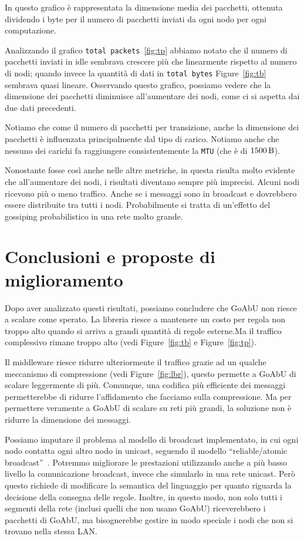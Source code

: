 \documentclass[target=bach]{thud}
\begin{document}
In questo grafico è rappresentata la dimensione media dei pacchetti, ottenuta dividendo i byte per il numero di pacchetti inviati da ogni nodo per ogni computazione.

Analizzando il grafico \lstinline{total packets}~\ref{fig:tp} abbiamo notato che il numero di pacchetti inviati in idle sembrava crescere più che linearmente rispetto al numero di nodi; quando invece la quantità di dati in \lstinline{total bytes} Figure~\ref{fig:tb} sembrava quasi lineare.
Osservando questo grafico, possiamo vedere che la dimensione dei pacchetti diminuisce all'aumentare dei nodi, come ci si aspetta dai due dati precedenti.

Notiamo che come il numero di pacchetti per transizione, anche la dimensione dei pacchetti è influenzata principalmente dal tipo di carico.
Notiamo anche che nessuno dei carichi fa raggiungere consistentemente la \lstinline{MTU} (che è di $\qty{1500}{\byte}$).

Nonostante fosse così anche nelle altre metriche, in questa risulta molto evidente che all'aumentare dei nodi, i risultati diventano sempre più imprecisi.
Alcuni nodi ricevono più o meno traffico. Anche se i messaggi sono in broadcast e dovrebbero essere distribuite tra tutti i nodi.
Probabilmente si tratta di un'effetto del gossiping probabilistico in una rete molto grande.

\section{Conclusioni e proposte di miglioramento}

Dopo aver analizzato questi risultati, possiamo concludere che GoAbU non riesce a scalare come sperato. La libreria riesce a mantenere un costo per regola non troppo alto quando si arriva a grandi quantità di regole esterne.Ma il traffico complessivo rimane troppo alto (vedi Figure~\ref{fig:tb} e Figure~\ref{fig:tp}).

Il middleware riesce ridurre ulteriormente il traffico grazie ad un qualche meccanismo di compressione (vedi Figure~\ref{fig:lbr}), questo permette a GoAbU di scalare leggermente di più. Comunque, una codifica più efficiente dei messaggi permetterebbe di ridurre l'affidamento che facciamo sulla compressione. Ma per permettere veramente a GoAbU di scalare su reti più grandi, la soluzione non è ridurre la dimensione dei messaggi.

Possiamo imputare il problema al modello di broadcast implementato, in cui ogni nodo contatta ogni altro nodo in unicast, seguendo il modello ``reliable/atomic broadcast''~\cite{joseph1989reliable}.
Potremmo migliorare le prestazioni utilizzando anche a più basso livello la comunicazione broadcast, invece che simularlo in una rete unicast. Però questo richiede di modificare la semantica del linguaggio per quanto riguarda la decisione della consegna delle regole.
Inoltre, in questo modo, non solo tutti i segmenti della rete (inclusi quelli che non usano GoAbU) riceverebbero i pacchetti di GoAbU, ma bisognerebbe gestire in modo speciale i nodi che non si trovano nella stessa LAN.
\end{document}
